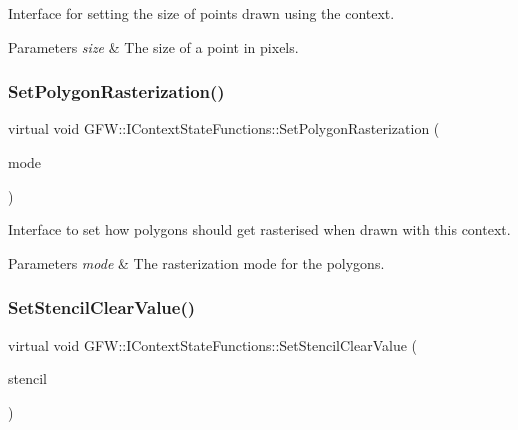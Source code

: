 Interface for setting the size of points drawn using the context. 


\begin{DoxyParams}{Parameters}
{\em size} & The size of a point in pixels. \\
\hline
\end{DoxyParams}
\mbox{\label{class_g_f_w_1_1_i_context_state_functions_abf50b9cb073e73caa0d49248d1f9cbb0}} 
\subsubsection{\texorpdfstring{Set\+Polygon\+Rasterization()}{SetPolygonRasterization()}}
{\footnotesize\ttfamily virtual void G\+F\+W\+::\+I\+Context\+State\+Functions\+::\+Set\+Polygon\+Rasterization (\begin{DoxyParamCaption}\item[{\hyperlink{namespace_g_f_w_a9e0ba6f593449f3060559ead1bc7e92f}{Rasterization\+Mode}}]{mode }\end{DoxyParamCaption})\hspace{0.3cm}{\ttfamily [pure virtual]}}



Interface to set how polygons should get rasterised when drawn with this context. 


\begin{DoxyParams}{Parameters}
{\em mode} & The rasterization mode for the polygons. \\
\hline
\end{DoxyParams}
\mbox{\label{class_g_f_w_1_1_i_context_state_functions_a3d504c4c6cb646780cf433932272faef}} 
\subsubsection{\texorpdfstring{Set\+Stencil\+Clear\+Value()}{SetStencilClearValue()}}
{\footnotesize\ttfamily virtual void G\+F\+W\+::\+I\+Context\+State\+Functions\+::\+Set\+Stencil\+Clear\+Value (\begin{DoxyParamCaption}\item[{int}]{stencil }\end{DoxyParamCaption})\hspace{0.3cm}{\ttfamily [pure virtual]}}



